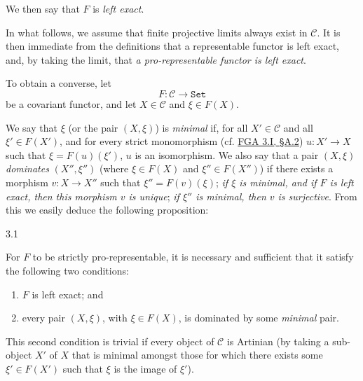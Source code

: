  We then say that \(F\) is \emph{left exact}.\par{}In what follows, we assume that finite projective limits always exist in \(\mathcal {C}\).
  It is then immediate from the definitions that a representable functor is left exact, and, by taking the limit, that \emph{a pro-representable functor is left exact}.\par{}To obtain a converse, let
  \[     F\colon  \mathcal {C} \to  \mathtt {Set}   \]
  be a covariant functor, and let \(X\in \mathcal {C}\) and \(\xi \in  F(X)\).
  
  We say that \(\xi \) (or the pair \((X,\xi )\)) is \emph{minimal} if, for all \(X'\in \mathcal {C}\) and all \(\xi '\in  F(X')\), and for every strict monomorphism (cf. \hyperref[fga3.i-a.2]{FGA 3.I, §A.2}) \(u\colon  X'\to  X\) such that \(\xi =F(u)(\xi ')\), \(u\) is an isomorphism.
  We also say that a pair \((X,\xi )\) \emph{dominates} \((X'',\xi '')\) (where \(\xi \in  F(X)\) and \(\xi ''\in  F(X'')\)) if there exists a morphism \(v\colon  X\to  X''\) such that \(\xi ''=F(v)(\xi )\);
  \emph{if \(\xi \) is minimal, and if \(F\) is left exact, then this morphism \(v\) is unique};
  \emph{if \(\xi ''\) is minimal, then \(v\) is surjective}.
  From this we easily deduce the following proposition:\begin{proposition}{3.1}\label{fga3.ii-a.3-proposition-3.1}\skipsinglepar\par{}For \(F\) to be strictly pro-representable, it is necessary and sufficient that it satisfy the following two conditions:

    
 \begin{enumerate}
      
 \item[i.]
        \(F\) is left exact; and
      

      
 \item[ii.]
        every pair \((X,\xi )\), with \(\xi \in  F(X)\), is dominated by some \emph{minimal} pair.
      

    \end{enumerate}\end{proposition}\par{}This second condition is trivial if every object of \(\mathcal {C}\) is Artinian (by taking a sub-object \(X'\) of \(X\) that is minimal amongst those for which there exists some \(\xi '\in  F(X')\) such that \(\xi \) is the image of \(\xi '\)).
